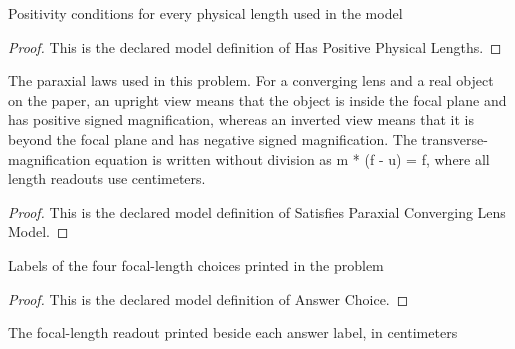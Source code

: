 \begin{definition}
  \label{def:physics:phyx-mini-0149:phyxminiproblems-problemphyxmini0149-haspositivephysicallengths}
  Positivity conditions for every physical length used in the model
\end{definition}
\begin{proof}
  This is the declared model definition of Has Positive Physical Lengths.
\end{proof}
\begin{definition}
  \label{def:physics:phyx-mini-0149:phyxminiproblems-problemphyxmini0149-satisfiesparaxialconverginglensmodel}
  The paraxial laws used in this problem. For a converging lens and a real object on the paper, an upright view means that the object is inside the focal plane and has positive signed magnification, whereas an inverted view means that it is beyond the focal plane and has negative signed magnification. The transverse-magnification equation is written without division as m * (f - u) = f, where all length readouts use centimeters.
\end{definition}
\begin{proof}
  This is the declared model definition of Satisfies Paraxial Converging Lens Model.
\end{proof}
\begin{definition}
  \label{def:physics:phyx-mini-0149:phyxminiproblems-problemphyxmini0149-answerchoice}
  Labels of the four focal-length choices printed in the problem
\end{definition}
\begin{proof}
  This is the declared model definition of Answer Choice.
\end{proof}
\begin{definition}
  \label{def:physics:phyx-mini-0149:phyxminiproblems-problemphyxmini0149-displayedfocallengthincentimeters}
  The focal-length readout printed beside each answer label, in centimeters
\end{definition}
